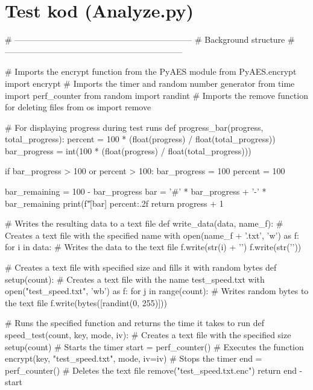 \chapter{Test kod (Analyze.py)}
\label{app:analyze}

\begin{python}
# ---------------------------------------------------------------
#                   Background structure
# ---------------------------------------------------------------

# Imports the encrypt function from the PyAES module
from PyAES.encrypt import encrypt
# Imports the timer and random number generator
from time import perf_counter
from random import randint
# Imports the remove function for deleting files
from os import remove


# For displaying progress during test runs
def progress_bar(progress, total_progress):
    percent = 100 * (float(progress) / float(total_progress))
    bar_progress = int(100 * (float(progress) / float(total_progress)))

    if bar_progress > 100 or percent > 100:
        bar_progress = 100
        percent = 100

    bar_remaining = 100 - bar_progress
    bar = '#' * bar_progress + '-' * bar_remaining
    print(f"\r[{bar}] {percent:.2f}%
    return progress + 1


# Writes the resulting data to a text file
def write_data(data, name_f):
    # Creates a text file with the specified name
    with open(name_f + '.txt', 'w') as f:
        for i in data:
            # Writes the data to the text file
            f.write(str(i) + '\n')
        f.write(str('\n'))


# Creates a text file with specified size and fills it with random bytes
def setup(count):
        # Creates a text file with the name test_speed.txt
        with open("test_speed.txt", 'wb') as f:
            for j in range(count):
                # Writes random bytes to the text file
                f.write(bytes([randint(0, 255)]))


# Runs the specified function and returns the time it takes to run
def speed_test(count, key, mode, iv):
    # Creates a text file with the specified size
    setup(count)
    # Starts the timer
    start = perf_counter()
    # Executes the function
    encrypt(key, "test_speed.txt", mode, iv=iv)
    # Stops the timer
    end = perf_counter()
    # Deletes the text file
    remove("test_speed.txt.enc")
    return end - start


\end{python}
